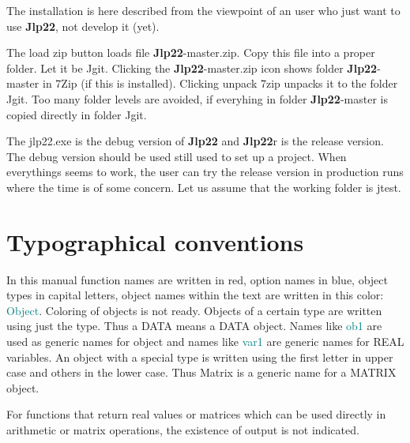 The installation is here described from the viewpoint of an user
who just want to use \textbf{Jlp22}, not develop it (yet).

The load zip button loads file \textbf{Jlp22}-master.zip. Copy this file into a proper folder.
Let it be Jgit. Clicking the \textbf{Jlp22}-master.zip icon shows folder \textbf{Jlp22}-master in
7Zip (if this is installed). Clicking unpack 7zip unpacks it to the folder Jgit.
Too many folder levels are avoided, if everyhing in folder \textbf{Jlp22}-master
is copied directly in
folder Jgit.

The jlp22.exe is the debug version of \textbf{Jlp22} and \textbf{Jlp22}r is the release version.
The debug version should be
used still used to set up a project. When everythings seems to work, the user
can try the release version in production runs where the time is of some concern.
Let us assume that the working folder is jtest.
\section{Typographical conventions}
\label{typo}
In this manual function names are written in red, option names in blue, object types in
capital letters, object names within the text are written in this color: \textcolor{teal}{Object}. Coloring of objects
is not ready. Objects of a certain type are written using just the type. Thus
a DATA means a DATA object.
Names like \textcolor{teal}{ob1} are used as generic names for object and names like  \textcolor{teal}{var1}
are generic names for REAL variables. An object with a special type is written
using the first letter in upper case and others in the lower case. Thus Matrix is a
generic name for a MATRIX object.

For functions that return real values or matrices which can be
used directly in arithmetic or matrix operations,
the existence of output is not indicated.

